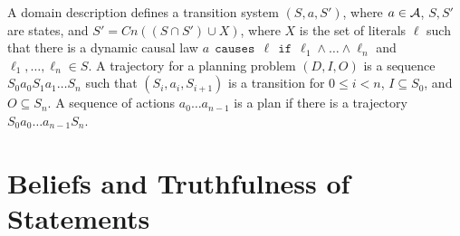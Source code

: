 \documentclass{article}
\newcommand{\causesif}[1]{\:\: \texttt{causes} \:\: {#1} \:\: \texttt{if} \:\:}
\begin{document}
A domain description defines a transition system $(S,a,S')$, where $a\in {\cal A}$, $S,S'$ are
states, and $S' = Cn((S \cap S') \cup X)$, where $X$ is the set of literals $\ell$ such that
there is a dynamic causal law $a \causesif{\ell} \ell_1\wedge \dots \wedge \ell_n$ and
$\ell_1,\dots,\ell_n \in S$. A trajectory for a planning problem $(D,I,O)$ is a 
sequence $S_0 a_0 S_1 a_1 \dots S_n$ such that $(S_i,a_i,S_{i+1})$ is a transition for
$0\leq i <n$, $I \subseteq S_0$, and $O \subseteq S_n$. A sequence of actions $a_0 \dots a_{n-1}$ is
a plan if there is a trajectory $S_0 a_0 \dots a_{n-1}S_n$.
\fi
%


\section{Beliefs and Truthfulness of Statements} 
\end{document}

